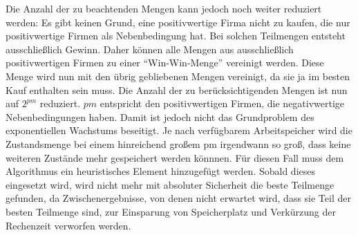 Die Anzahl der zu beachtenden Mengen kann jedoch noch weiter reduziert werden: Es gibt keinen Grund, eine positivwertige Firma nicht zu kaufen, die nur positivwertige Firmen als Nebenbedingung hat. Bei solchen Teilmengen entsteht ausschließlich Gewinn. Daher können alle Mengen aus ausschließlich positivwertigen Firmen zu einer "`Win-Win-Menge"' vereinigt werden. Diese Menge wird nun mit den übrig gebliebenen Mengen vereinigt, da sie ja im besten Kauf enthalten sein muss. Die Anzahl der zu berücksichtigenden Mengen ist nun auf \(2^{pm}\) reduziert. \(pm\) entspricht den positivwertigen Firmen, die negativwertige Nebenbedingungen haben.
Damit ist jedoch nicht das Grundproblem des exponentiellen Wachstums beseitigt. Je nach verfügbarem Arbeitspeicher wird die Zustandsmenge bei einem hinreichend großem pm irgendwann so groß, dass keine weiteren Zustände mehr gespeichert werden könnnen.
Für diesen Fall muss dem Algorithmus ein heuristisches Element hinzugefügt werden. Sobald dieses eingesetzt wird, wird nicht mehr mit absoluter Sicherheit die beste Teilmenge gefunden, da Zwischenergebnisse, von denen nicht erwartet wird, dass sie Teil der besten Teilmenge sind, zur Einsparung von Speicherplatz und Verkürzung der Rechenzeit verworfen werden.